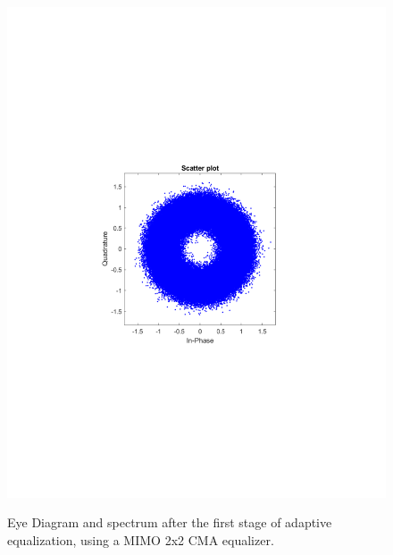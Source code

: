 \begin{refsection}
\begin{figure}[H]
\begin{minipage}{0.30\textwidth}
		\includegraphics[clip, trim=4cm 8cm 4cm 8cm, width=1\textwidth]{./sdf/m_qam_system/figures/expResults/intradyne/3_const_16GBdInSig13dB_AfMIMO1.pdf}
		\label{fig:16GBdSpecBefFec}
	\end{minipage}
	\caption{Eye Diagram and spectrum after the first stage of adaptive equalization, using a MIMO 2x2 CMA equalizer.}
\end{figure}


\end{refsection}
